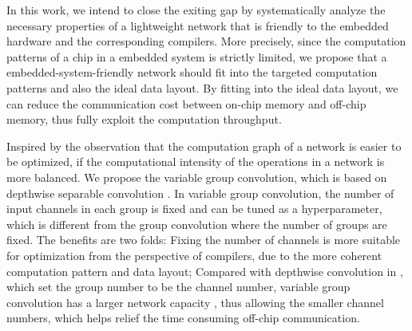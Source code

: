 \documentclass{article}
\begin{document}
In this work, we intend to close the exiting gap by systematically analyze the necessary properties of a lightweight network that is friendly to the embedded hardware and the corresponding compilers. More precisely, since the computation patterns of a chip in a embedded system is strictly limited, we propose that a embedded-system-friendly network should fit into the targeted computation patterns and also the ideal data layout. By fitting into the ideal data layout, we can reduce the communication cost between on-chip memory and off-chip memory, thus fully exploit the computation throughput. 

Inspired by the observation that the computation graph of a network is easier to be optimized, if the computational intensity of the operations in a network is more balanced. We propose the variable group convolution, which is based on depthwise separable convolution \cite{krizhevsky2012imagenet, chollet2017xception, xie2017aggregated}.
In variable group convolution, the number of input channels in each group is fixed and can be tuned as a hyperparameter, which is different from the group convolution where the number of groups are fixed. 
The benefits are two folds: Fixing the number of channels is more suitable for optimization from the perspective of compilers, due to the more coherent computation pattern and data layout; Compared with depthwise convolution in \cite{howard2017mobilenets, sandler2018mobilenetv2}, which set the group number to be the channel number, variable group convolution has a larger network capacity \cite{sandler2018mobilenetv2}, thus allowing the smaller channel numbers, which helps relief the time consuming off-chip communication. 
\end{document}
